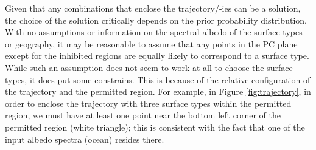 \documentclass[iop,numberedappendix,apj,]{emulateapj}
\begin{document}
Given that any combinations that enclose the trajectory/-ies can be a solution, the choice of the solution critically depends on the prior probability distribution. 
With no assumptions or information on the spectral albedo of the surface types or geography, it may be reasonable to assume that any points in the PC plane except for the inhibited regions are equally likely to correspond to a surface type. 
While such an assumption does not seem to work at all to choose the surface types, it does put some constrains. 
This is because of the relative configuration of the trajectory and the permitted region. 
For example, in Figure \ref{fig:trajectory}, in order to enclose the trajectory with three surface types within the permitted region, we must have at least one point near the bottom left corner of the permitted region (white triangle); this is consistent with the fact that one of the input albedo spectra (ocean) resides there. 
\end{document}
